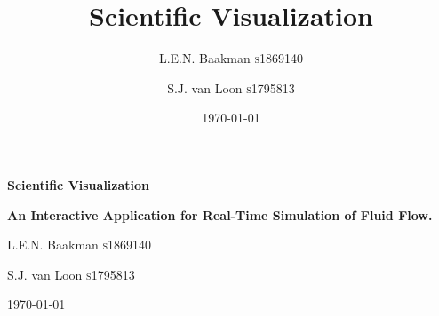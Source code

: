 \documentclass[a4paper]{report}
\title{Scientific Visualization}
\author{L.E.N. Baakman \textsc{s}1869140}
\author{S.J. van Loon \textsc{s}1795813}
\affil{University of Groningen}
\date{\today}
\begin{document}
\hypersetup{pageanchor=false}
\begin{titlepage}
    \centering
    \par\vspace{9cm}
          
    \par\vspace{3cm}
    {\huge\bfseries  Scientific Visualization \par}
    {\large\bfseries  An Interactive Application for Real-Time Simulation of Fluid Flow.\par}

    \vspace{2cm}\par
    \vspace{2cm}\par

    {\Large L.E.N. Baakman \textsc{s}1869140\par}
    {\Large S.J. van Loon \textsc{s}1795813\par}

    \vfill
    {\large \today\par}
\end{titlepage}
\hypersetup{pageanchor=true}




\end{document}
